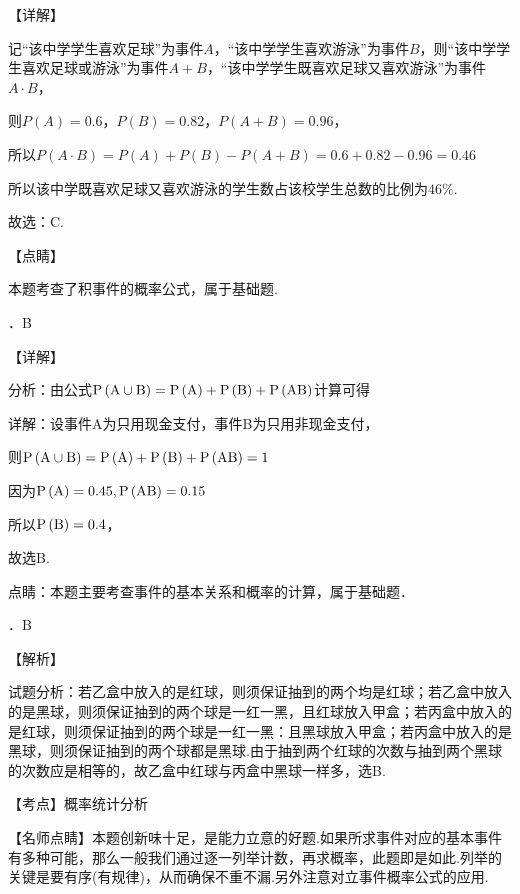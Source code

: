 \noindent 【详解】

\noindent 记``该中学学生喜欢足球''为事件$A$，``该中学学生喜欢游泳''为事件$B$，则``该中学学生喜欢足球或游泳''为事件$A+B$，``该中学学生既喜欢足球又喜欢游泳''为事件$A\cdot B$，

\noindent 则$P(A)=0.6$，$P(B)=0.82$，$P\left(A+B\right)=0.96$，

\noindent 所以$P(A\cdot B)=$$P(A)+P(B)-P(A+B)$$=0.6+0.82-0.96=0.46$

\noindent 所以该中学既喜欢足球又喜欢游泳的学生数占该校学生总数的比例为$46\% $.

\noindent 故选：C.

\noindent 【点睛】

\noindent 本题考查了积事件的概率公式，属于基础题.

．B

\noindent 【详解】

\noindent 分析：由公式${\rm P}\left({\rm A}\cup {\rm B}\right)={\rm P}\left({\rm A}\right)+{\rm P}\left({\rm B}\right)+{\rm P}\left({\rm AB}\right)$计算可得

\noindent 详解：设事件A为只用现金支付，事件B为只用非现金支付，

\noindent 则${\rm P}\left({\rm A}\cup {\rm B}\right)={\rm P}\left({\rm A}\right)+{\rm P}\left({\rm B}\right)+{\rm P}\left({\rm AB}\right)=1$

\noindent 因为${\rm P}\left({\rm A}\right)=0.45,{\rm P}\left({\rm AB}\right)=0.15$

\noindent 所以${\rm P}\left({\rm B}\right)=0.4$，

\noindent 故选B.

\noindent 点睛：本题主要考查事件的基本关系和概率的计算，属于基础题．

．B

\noindent 【解析】

\noindent 试题分析：若乙盒中放入的是红球，则须保证抽到的两个均是红球；若乙盒中放入的是黑球，则须保证抽到的两个球是一红一黑，且红球放入甲盒；若丙盒中放入的是红球，则须保证抽到的两个球是一红一黑：且黑球放入甲盒；若丙盒中放入的是黑球，则须保证抽到的两个球都是黑球.由于抽到两个红球的次数与抽到两个黑球的次数应是相等的，故乙盒中红球与丙盒中黑球一样多，选B.

\noindent 【考点】概率统计分析

\noindent 【名师点睛】本题创新味十足，是能力立意的好题.如果所求事件对应的基本事件有多种可能，那么一般我们通过逐一列举计数，再求概率，此题即是如此.列举的关键是要有序(有规律)，从而确保不重不漏.另外注意对立事件概率公式的应用.

